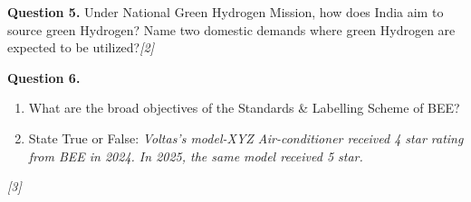 \documentclass[11pt,a4paper]{article}
\newcommand{\pts}[1]{\hfill \textit{[#1]}}
\begin{document}
\medskip

\noindent \textbf{Question 5.} Under National Green Hydrogen Mission, how does India aim to source green Hydrogen? Name two domestic demands where green Hydrogen are expected to be utilized?\pts{2}

\medskip

\noindent \textbf{Question 6.}
\begin{enumerate}[label=(\alph*)]
  \item What are the broad objectives of the Standards \& Labelling Scheme of BEE?
  \item State True or False: \textit{Voltas's model-XYZ Air-conditioner received 4 star rating from BEE in 2024. In 2025, the same model received 5 star.}
\end{enumerate}\pts{3}
\end{document}
